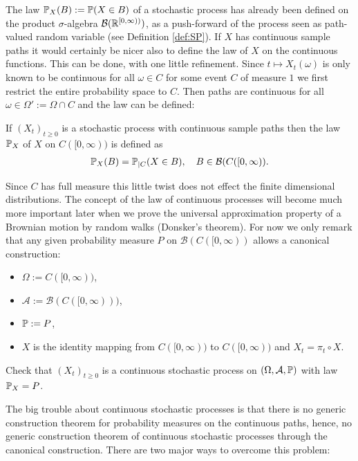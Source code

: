 The law $\P_X(B):=\P(X\in B)$ of a stochastic process has already been defined on the product $\sigma$-algebra $\mathcal B(\R^{[0,\infty))})$, as a push-forward of the process seen as path-valued random variable (see Definition \ref{def:SP}). If $X$ has continuous sample paths it would certainly be nicer also to define the law of $X$ on the continuous functions. This can be done, with one little refinement. Since $t\mapsto X_t(\omega)$ is only known to be continuous for all $\omega\in C$ for some event $C$ of measure $1$ we first restrict the entire probability space to $C$. Then paths are continuous for all $\omega\in \Omega':=\Omega\cap C$ and the law can be defined:
\begin{ldef}
	\begin{deff}
		If $(X_t)_{t\geq 0}$ is a stochastic process with continuous sample paths then the law $\P_X$ of $X$ on $C([0,\infty))$ is defined as 
		\begin{align*}
			\P_X(B)=\P_{|C}(X\in B),\quad B\in \mathcal B(C([0,\infty)).
		\end{align*}
	\end{deff}
\end{ldef}
Since $C$ has full measure this little twist does not effect the finite dimensional distributions. The concept of the law of continuous processes will become much more important later when we prove the universal approximation property of a Brownian motion by random walks (Donsker's theorem). For now we only remark that any given probability measure $P$ on $\mathcal B(C([0,\infty))$ allows a canonical construction:
\begin{itemize}
	\item $\Omega:=C([0,\infty))$,
	\item $\mathcal A:=\mathcal B(C([0,\infty)))$,
	\item $\P:=P$,
	\item $X$ is the identity mapping from $C([0,\infty))$ to $C([0,\infty))$ and $X_t=\pi_t\circ X$.
\end{itemize}
\begin{luebung}
	Check that $(X_t)_{t\geq 0}$ is a continuous stochastic process on $(\Omega, \mathcal A, \P)$ with law $\P_X=P$.
\end{luebung}
The big trouble about continuous stochastic processes is that there is no generic construction theorem for probability measures on the continuous paths, hence, no generic construction theorem of continuous stochastic processes through the canonical construction. There are two major ways to overcome this problem: 
